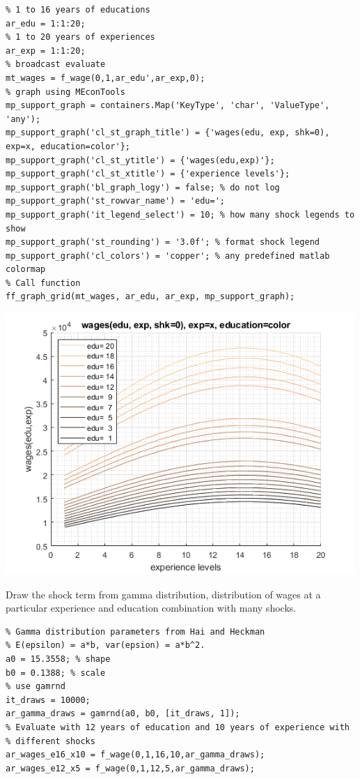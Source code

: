 \documentclass[
]{book}
\begin{document}
\begin{verbatim}
% 1 to 16 years of educations
ar_edu = 1:1:20;
% 1 to 20 years of experiences
ar_exp = 1:1:20;
% broadcast evaluate
mt_wages = f_wage(0,1,ar_edu',ar_exp,0);
% graph using MEconTools
mp_support_graph = containers.Map('KeyType', 'char', 'ValueType', 'any');
mp_support_graph('cl_st_graph_title') = {'wages(edu, exp, shk=0), exp=x, education=color'};
mp_support_graph('cl_st_ytitle') = {'wages(edu,exp)'};
mp_support_graph('cl_st_xtitle') = {'experience levels'};
mp_support_graph('bl_graph_logy') = false; % do not log
mp_support_graph('st_rowvar_name') = 'edu=';
mp_support_graph('it_legend_select') = 10; % how many shock legends to show
mp_support_graph('st_rounding') = '3.0f'; % format shock legend
mp_support_graph('cl_colors') = 'copper'; % any predefined matlab colormap
% Call function
ff_graph_grid(mt_wages, ar_edu, ar_exp, mp_support_graph);
\end{verbatim}

\includegraphics[width=5.20833in,height=\textheight]{img/fs_wage_equation_images/figure_0.png}

Draw the shock term from gamma distribution, distribution of wages at a
particular experience and education combination with many shocks.

\begin{verbatim}
% Gamma distribution parameters from Hai and Heckman
% E(epsilon) = a*b, var(epsion) = a*b^2.
a0 = 15.3558; % shape
b0 = 0.1388; % scale
% use gamrnd
it_draws = 10000;
ar_gamma_draws = gamrnd(a0, b0, [it_draws, 1]);
% Evaluate with 12 years of education and 10 years of experience with
% different shocks
ar_wages_e16_x10 = f_wage(0,1,16,10,ar_gamma_draws);
ar_wages_e12_x5 = f_wage(0,1,12,5,ar_gamma_draws);
\end{verbatim}
\end{document}
